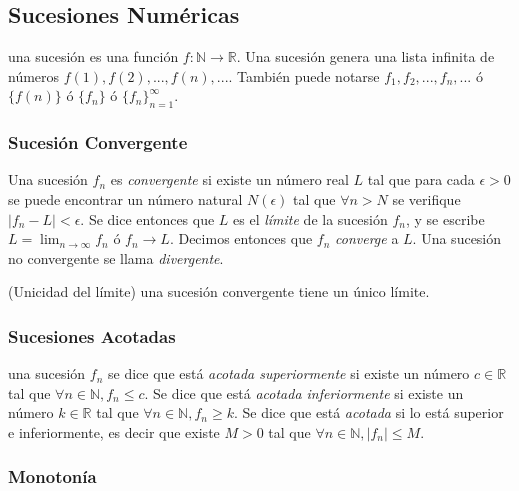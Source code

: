 \hypertarget{sucesiones-numuxe9ricas}{%
\subsection{Sucesiones Numéricas}\label{sucesiones-numuxe9ricas}}

\Definicion una sucesión es una función
\(f : \ensuremath{\mathbb{N}}\rightarrow \mathbb{R}\). Una sucesión
genera una lista infinita de números \(f(1), f(2), ..., f(n), ...\).
También puede notarse \(f_1, f_2, ..., f_n, ...\) ó \(\{f(n)\}\) ó
\(\{f_n\}\) ó \(\{f_n\}_{n=1}^\infty\).

\hypertarget{sucesiuxf3n-convergente}{%
\subsubsection{Sucesión Convergente}\label{sucesiuxf3n-convergente}}

Una sucesión \(f_n\) es \emph{convergente} si existe un número real
\(L\) tal que para cada \(\epsilon > 0\) se puede encontrar un número
natural \(N(\epsilon)\) tal que \(\forall n > N\) se verifique
\(|f_n - L| < \epsilon\). Se dice entonces que \(L\) es el \emph{límite}
de la sucesión \(f_n\), y se escribe
\(L = \ensuremath{\lim_{n \to \infty} f_n}\) ó
\(f_n \longrightarrow L\). Decimos entonces que \(f_n\) \emph{converge}
a \(L\). Una sucesión no convergente se llama \emph{divergente}.

\Teorema (Unicidad del límite) una sucesión convergente tiene un único
límite.

\hypertarget{sucesiones-acotadas}{%
\subsubsection{Sucesiones Acotadas}\label{sucesiones-acotadas}}

\Definicion una sucesión \(f_n\) se dice que está \emph{acotada
superiormente} si existe un número \(c \in \mathbb{R}\) tal que
\(\forall n \in \ensuremath{\mathbb{N}}, f_n \leq c\). Se dice que está
\emph{acotada inferiormente} si existe un número \(k \in \mathbb{R}\)
tal que \(\forall n \in \ensuremath{\mathbb{N}}, f_n \geq k\). Se dice
que está \emph{acotada} si lo está superior e inferiormente, es decir
que existe \(M > 0\) tal que
\(\forall n \in \ensuremath{\mathbb{N}}, |f_n| \leq M\).

\hypertarget{monotonuxeda}{%
\subsubsection{Monotonía}\label{monotonuxeda}}

